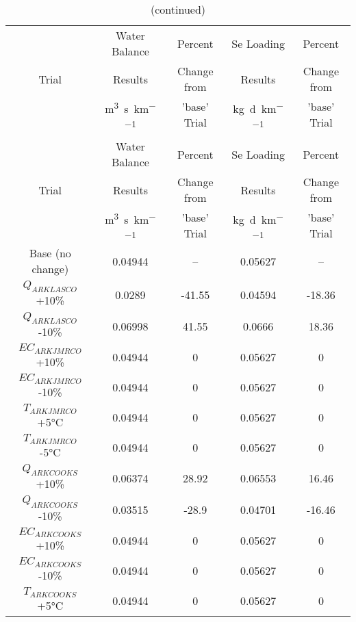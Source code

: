 \begin{linenumbers}
\begin{spacing}{1.0}
\begin{center}
\begin{longtable}{c|cc|cc}
    \caption[USR Sensitivity Analysis Results]{USR Sensitivity Analysis Results} \label{tab:USRSA}\\ 
	\hline
    \multirow{3}[1]{*}{Trial} & Water Balance & Percent & Se Loading & Percent \\
          & Results & Change from & Results & Change from \\ 
          & \si{\cubic\meter\per\second\per\kilo\meter} & 'base' Trial & \si{\kilo\gram\per\day\per\kilo\meter} & 'base' Trial \\
    \hline
    \hline
    \endfirsthead
    \caption[]{(continued)}\\
    \hline
    \multirow{3}[1]{*}{Trial} & Water Balance & Percent & Se Loading & Percent \\
          & Results & Change from & Results & Change from \\ 
          & \si{\cubic\meter\per\second\per\kilo\meter} & 'base' Trial & \si{\kilo\gram\per\day\per\kilo\meter} & 'base' Trial \\
    \hline
    \hline
    \endhead
	Base (no change)&						0.04944&	--&	0.05627&	--\\               
	$Q_{ARKLASCO}$ +10\%&					0.0289&	-41.55&	0.04594&	-18.36\\          
	$Q_{ARKLASCO}$ -10\%&					0.06998&	41.55&	0.0666&	18.36\\           
	$EC_{ARKJMRCO}$ +10\%&					0.04944&	0&	0.05627&	0\\               
	$EC_{ARKJMRCO}$ -10\%&					0.04944&	0&	0.05627&	0\\               
	$T_{ARKJMRCO}$ +5\si{\degreeCelsius}&	0.04944&	0&	0.05627&	0\\               
	$T_{ARKJMRCO}$ -5\si{\degreeCelsius}&	0.04944&	0&	0.05627&	0\\               
	$Q_{ARKCOOKS}$ +10\%&					0.06374&	28.92&	0.06553&	16.46\\       
	$Q_{ARKCOOKS}$ -10\%&					0.03515&	-28.9&	0.04701&	-16.46\\      
	$EC_{ARKCOOKS}$ +10\%&					0.04944&	0&	0.05627&	0\\               
	$EC_{ARKCOOKS}$ -10\%&					0.04944&	0&	0.05627&	0\\               
	$T_{ARKCOOKS}$ +5\si{\degreeCelsius}&	0.04944&	0&	0.05627&	0\\               

\end{longtable}
\end{center}
\end{spacing}
\end{linenumbers}
